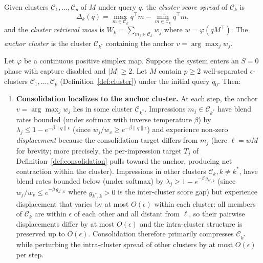 \begin{definition}
\label{def:cluster_salience}
\leanok
Given clusters $\mathcal{C}_1, \ldots, \mathcal{C}_p$ of $M$ under query $q$, the \emph{cluster score spread} of $\mathcal{C}_k$ is
\[
\Delta_k(q) = \max_{m \in \mathcal{C}_k} q^\top m - \min_{m \in \mathcal{C}_k} q^\top m,
\]
and the \emph{cluster retrieval mass} is $W_k = \sum_{m_j \in \mathcal{C}_k} w_j$ where $w = \varphi(qM^\top)$.  The \emph{anchor cluster} is the cluster $\mathcal{C}_{k^*}$ containing the anchor $v = \arg\max_j w_j$.
\end{definition}

\begin{theorem}
\label{thm:oscillation}
\leanok
{}
Let $\varphi$ be a continuous positive simplex map.  Suppose the system enters an $S = 0$ phase with capture disabled and $|M| \geq 2$.  Let $M$ contain $p \geq 2$ well-separated $\epsilon$-clusters $\mathcal{C}_1, \ldots, \mathcal{C}_p$ (Definition~\ref{def:cluster}) under the initial query $q_0$.  Then:
\begin{enumerate}
\item \textbf{Consolidation localizes to the anchor cluster.}  At each step, the anchor $v = \arg\max_j w_j$ lies in some cluster $\mathcal{C}_{k^*}$.  Impressions $m_j \in \mathcal{C}_{k^*}$ have blend rates bounded (under softmax with inverse temperature $\beta$) by $\lambda_j \leq 1 - e^{-\beta\|q\|\epsilon}$ (since $w_j/w_v \geq e^{-\beta\|q\|\epsilon}$) and experience non-zero \emph{displacement} because the consolidation target differs from $m_j$ (here $\ell = wM$ for brevity; more precisely, the per-impression target $T_j$ of Definition~\ref{def:consolidation} pulls toward the anchor, producing net contraction within the cluster).  Impressions in other clusters $\mathcal{C}_{k}, k \neq k^*$, have blend rates bounded below (under softmax) by $\lambda_j \geq 1 - e^{-\beta\,g_{k^*,k}}$ (since $w_j/w_v \leq e^{-\beta\,g_{k^*,k}}$ where $g_{k^*,k} > 0$ is the inter-cluster score gap) but experience displacement that varies by at most $O(\epsilon)$ within each cluster: all members of $\mathcal{C}_k$ are within $\epsilon$ of each other and all distant from $\ell$, so their pairwise displacements differ by at most $O(\epsilon)$ and the intra-cluster structure is preserved up to $O(\epsilon)$.  Consolidation therefore primarily compresses $\mathcal{C}_{k^*}$ while perturbing the intra-cluster spread of other clusters by at most $O(\epsilon)$ per step.


\end{enumerate}
\end{theorem}
